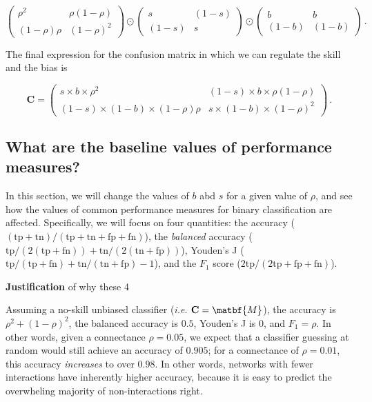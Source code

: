 \documentclass[11pt]{article}
\begin{document}
\[
\begin{pmatrix}
    \rho^2 & \rho (1-\rho) \\
    (1-\rho) \rho & (1-\rho)^2
\end{pmatrix} \odot \begin{pmatrix}
    s & (1-s) \\
    (1-s) & s
\end{pmatrix} \odot \begin{pmatrix}
    b & b \\
    (1-b) & (1-b)
\end{pmatrix}\,.
\]

The final expression for the confusion matrix in which we can regulate
the skill and the bias is

\[
\mathbf{C} = \begin{pmatrix}
    s\times b\times \rho^2 & (1-s)\times b\times \rho (1-\rho) \\
    (1-s)\times (1-b)\times (1-\rho) \rho & s\times (1-b)\times (1-\rho)^2
\end{pmatrix} \,.
\]

\hypertarget{what-are-the-baseline-values-of-performance-measures}{%
\subsection{What are the baseline values of performance
measures?}\label{what-are-the-baseline-values-of-performance-measures}}

In this section, we will change the values of \(b\) abd \(s\) for a
given value of \(\rho\), and see how the values of common performance
measures for binary classification are affected. Specifically, we will
focus on four quantities: the accuracy
(\((\text{tp}+\text{tn})/(\text{tp}+\text{tn}+\text{fp}+\text{fn})\)),
the \emph{balanced} accuracy
(\(\text{tp}/(2(\text{tp}+\text{fn}))+\text{tn}/(2(\text{tn}+\text{fp}))\)),
Youden's J
(\(\text{tp}/(\text{tp}+\text{fn})+\text{tn}/(\text{tn}+\text{fp})-1\)),
and the \(F_1\) score (\(2\text{tp}/(2\text{tp}+\text{fp}+\text{fn})\)).

\textbf{Justification} of why these 4

Assuming a no-skill unbiased classifier (\emph{i.e.}
\(\mathbf{C}=\matbf{M}\)), the accuracy is \(\rho^2 + (1-\rho)^2\), the
balanced accuracy is \(0.5\), Youden's J is \(0\), and \(F_1=\rho\). In
other words, given a connectance \(\rho = 0.05\), we expect that a
classifier guessing at random would still achieve an accuracy of
\(0.905\); for a connectance of \(\rho = 0.01\), this accuracy
\emph{increases} to over \(0.98\). In other words, networks with fewer
interactions have inherently higher accuracy, because it is easy to
predict the overwheling majority of non-interactions right.
\end{document}
